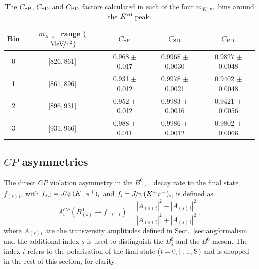 \documentclass[12pt,a4paper]{article}
\newcommand{\CP}{\ensuremath{{C\!P}}\xspace}
\def\PJ      {\ensuremath{J}\xspace}
\def\CP                {\ensuremath{C\!P}\xspace}
\def\Ppsi {\ensuremath{\psi}\xspace}
\def\jpsi     {{\ensuremath{{\PJ\mskip -3mu/\mskip -2mu\Ppsi\mskip 2mu}}}\xspace}
\newcommand{\mkpi}{\ensuremath{m_{\Km\pip}}\xspace}
\newcommand{\Bs}{\ensuremath{B^0_s}\xspace}
\newcommand{\Bd}{\ensuremath{B^0}\xspace}
\def\Kbar  {\kern 0.2em\overline{\kern -0.2em K}{}\xspace}
\def\Kstarzb {\ensuremath{\Kbar^{*0}}\xspace}
\newcommand{\mevcc}{\ensuremath{{\mathrm{\,Me\kern -0.1em V\!/}c^2}}\xspace}
\newcommand{\MeVcc}{\mevcc}
\newcommand{\Km}{\ensuremath{K^-}\xspace}
\newcommand{\pip}{\ensuremath{\pi^+}\xspace}
\newcommand{\secref}[1]{Sect.~\ref{#1}}
\begin{document}
\begin{table}[t]
  \begin{center}
  \caption{The $C_{\rm SP}$, $C_{\rm SD}$ and $C_{\rm PD}$ factors calculated in each of the four \mkpi bins around the \Kstarzb peak.}
    \begin{tabular}{c c c c c}
      \hline
      Bin & \mkpi range (\MeVcc) & $C_{\rm SP}$ & $C_{\rm SD}$ & $C_{\rm PD}$ \\
      \hline
      0 & [826,\,861] & 0.968 $\pm$ 0.017 & 0.9968 $\pm$ 0.0030 & 0.9827 $\pm$ 0.0048 \\
      1 & [861,\,896] & 0.931 $\pm$ 0.012 & 0.9978 $\pm$ 0.0021 & 0.9402 $\pm$ 0.0048 \\
      2 & [896,\,931] & 0.952 $\pm$ 0.012 & 0.9983 $\pm$ 0.0016 & 0.9421 $\pm$ 0.0056 \\
      3 & [931,\,966] & 0.988 $\pm$ 0.011 & 0.9986 $\pm$ 0.0012 & 0.9802 $\pm$ 0.0066 \\
      \hline
    \end{tabular}
  \label{tab:CSPfactors}
  \end{center}
\end{table}




\subsection{\CP asymmetries}
\label{sec:cpv}

The direct \CP violation asymmetry in the $B^0_{(s)}$ decay rate to the final state $f_{(s)\,i}$, with $f_{s,i} = \jpsi (K^-\pi^+)_i$ and $f_i=\jpsi (K^+\pi^-)_i$, is defined as 
\begin{equation}
\label{decayrates}
A^{\CP}_i (B^0_{(s)} \to f_{(s)\,i}) = \frac{|\overline{A}_{(s)\,i}|^2 -|A_{(s)\,i}|^2}{| \overline{A}_{(s)\,i}|^2 + |A_{(s)\,i}|^2} \,,
\end{equation}
where $A_{(s)\,i}$ are the transversity amplitudes defined in \secref{sec:angformalism} and the additional index $s$ is used to distinguish the \Bs and the \Bd-meson.  
The index $i$ refers to the polarisation of the final state ($i = 0,\parallel,\perp, {\rm S}$) and is dropped in the rest of this section, for clarity. 
\end{document}
